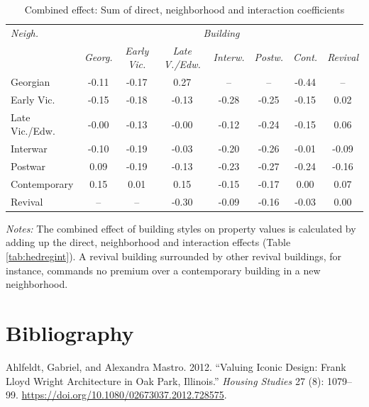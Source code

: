 \documentclass[]{article}
\begin{document}
\newpage

\begin{table}[ht]
\centering
\caption{Combined effect: Sum of direct, neighborhood and interaction coefficients}
\label{tab:comb}
\begin{tabular}{lccccccc}
\toprule
\emph{Neigh.} & \multicolumn{7}{c}{\emph{Building}} \\
 \cmidrule(lr){1-1}
 \cmidrule(lr){2-8}
& \emph{Georg.} & \emph{Early Vic.} & \emph{Late V./Edw.} & \emph{Interw.} & \emph{Postw.} & \emph{Cont.} & \emph{Revival} \\ 
  \cmidrule(lr){2-8}
Georgian & -0.11 & -0.17 & 0.27 & -- &--  & -0.44 &--  \\ 
  Early Vic. & -0.15 & -0.18 & -0.13 & -0.28 & -0.25 & -0.15 & 0.02 \\ 
  Late Vic./Edw. & -0.00 & -0.13 & -0.00 & -0.12 & -0.24 & -0.15 & 0.06 \\ 
  Interwar & -0.10 & -0.19 & -0.03 & -0.20 & -0.26 & -0.01 & -0.09 \\ 
  Postwar & 0.09 & -0.19 & -0.13 & -0.23 & -0.27 & -0.24 & -0.16 \\ 
  Contemporary & 0.15 & 0.01 & 0.15 & -0.15 & -0.17 & 0.00 & 0.07 \\ 
  Revival & -- & -- & -0.30 & -0.09 & -0.16 & -0.03 & 0.00 \\ 
\bottomrule
\end{tabular}
\begin{minipage}{\textwidth}
\vspace{0.25cm}
\footnotesize \emph{Notes:} The combined effect of building styles on property values is calculated by adding up the direct, neighborhood and interaction effects (Table \ref{tab:hedregint}). A revival building surrounded by other revival buildings, for instance, commands no premium over a contemporary building in a new neighborhood.
\end{minipage}
\end{table}

\clearpage

\hypertarget{bibliography}{%
\section*{Bibliography}\label{bibliography}}

\hypertarget{refs}{}
\leavevmode\hypertarget{ref-Ahlfeldt2012}{}%
Ahlfeldt, Gabriel, and Alexandra Mastro. 2012. ``Valuing Iconic Design:
Frank Lloyd Wright Architecture in Oak Park, Illinois.'' \emph{Housing
Studies} 27 (8): 1079--99.
\url{https://doi.org/10.1080/02673037.2012.728575}.
\end{document}
